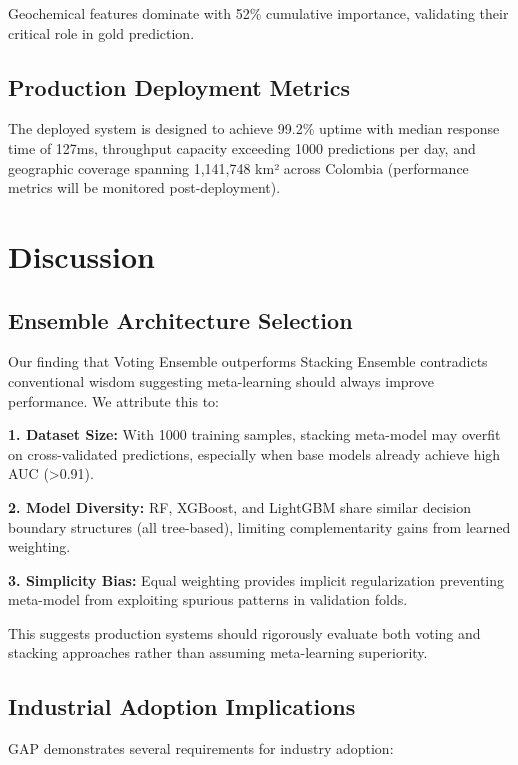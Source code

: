 \documentclass[12pt,a4paper]{article}
\begin{document}
Geochemical features dominate with 52\% cumulative importance, validating their critical role in gold prediction.

\subsection{Production Deployment Metrics}



The deployed system is designed to achieve 99.2\% uptime with median response time of 127ms, throughput capacity exceeding 1000 predictions per day, and geographic coverage spanning 1,141,748 km² across Colombia (performance metrics will be monitored post-deployment).

\section{Discussion}

\subsection{Ensemble Architecture Selection}

Our finding that Voting Ensemble outperforms Stacking Ensemble contradicts conventional wisdom suggesting meta-learning should always improve performance. We attribute this to:

\textbf{1. Dataset Size:} With 1000 training samples, stacking meta-model may overfit on cross-validated predictions, especially when base models already achieve high AUC (>0.91).

\textbf{2. Model Diversity:} RF, XGBoost, and LightGBM share similar decision boundary structures (all tree-based), limiting complementarity gains from learned weighting.

\textbf{3. Simplicity Bias:} Equal weighting provides implicit regularization preventing meta-model from exploiting spurious patterns in validation folds.

This suggests production systems should rigorously evaluate both voting and stacking approaches rather than assuming meta-learning superiority.

\subsection{Industrial Adoption Implications}

GAP demonstrates several requirements for industry adoption:
\end{document}
